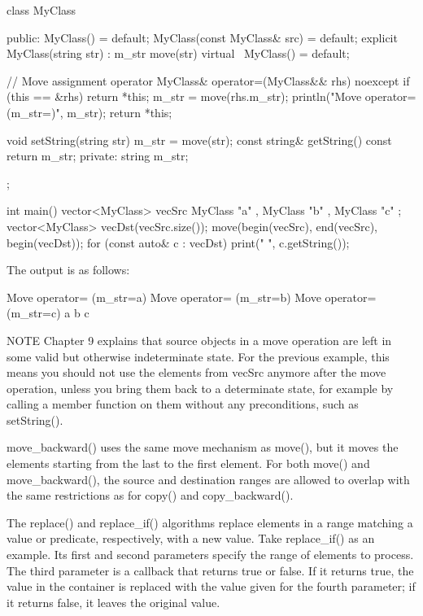 \begin{cpp}
class MyClass
{
    public:
        MyClass() = default;
        MyClass(const MyClass& src) = default;
        explicit MyClass(string str) : m_str { move(str) } {}
        virtual ~MyClass() = default;

        // Move assignment operator
        MyClass& operator=(MyClass&& rhs) noexcept {
            if (this == &rhs) { return *this; }
            m_str = move(rhs.m_str);
            println("Move operator= (m_str={})", m_str);
            return *this;
        }

        void setString(string str) { m_str = move(str); }
        const string& getString() const { return m_str; }
    private:
        string m_str;
};

int main()
{
    vector<MyClass> vecSrc { MyClass { "a" }, MyClass { "b" }, MyClass { "c" } };
    vector<MyClass> vecDst(vecSrc.size());
    move(begin(vecSrc), end(vecSrc), begin(vecDst));
    for (const auto& c : vecDst) { print("{} ", c.getString()); }
}
\end{cpp}

The output is as follows:

\begin{shell}
Move operator= (m_str=a)
Move operator= (m_str=b)
Move operator= (m_str=c)
a b c
\end{shell}

\begin{myNotic}{NOTE}
Chapter 9 explains that source objects in a move operation are left in some valid but otherwise indeterminate state. For the previous example, this means you should not use the elements from vecSrc anymore after the move operation, unless you bring them back to a determinate state, for example by calling a member function on them without any preconditions, such as setString().
\end{myNotic}

move\_backward() uses the same move mechanism as move(), but it moves the elements starting from the last to the first element. For both move() and move\_backward(), the source and destination ranges are allowed to overlap with the same restrictions as for copy() and copy\_backward().


The replace() and replace\_if() algorithms replace elements in a range matching a value or predicate, respectively, with a new value. Take replace\_if() as an example. Its first and second parameters specify the range of elements to process. The third parameter is a callback that returns true or false. If it returns true, the value in the container is replaced with the value given for the fourth parameter; if it returns false, it leaves the original value.

